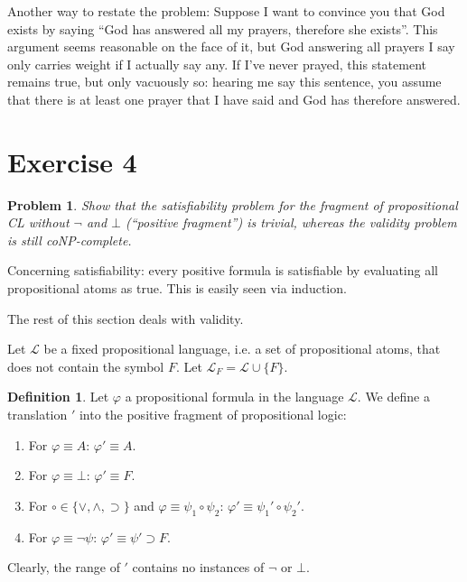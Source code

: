 \documentclass[a4paper,10pt]{article}
\newcommand{\imp}{\supset}
\renewcommand{\L}{\mathcal{L}}
\newcommand{\Lf}{\L_F}
\newtheorem*{problem*}{Problem}
\theoremstyle{definition}
\newtheorem{definition}[theorem]{Definition}
\begin{document}
Another way to restate the problem: Suppose I want to convince you that God exists by saying ``God has answered all my prayers, therefore she exists''. This argument seems reasonable on the face of it, but God answering all prayers I say only carries weight if I actually say any. If I've never prayed, this statement remains true, but only vacuously so: hearing me say this sentence, you assume that there is at least one prayer that I have said and God has therefore answered.
\section{Exercise 4}
\begin{problem*}
Show  that  the  satisfiability  problem  for  the  fragment  of  propositional CL without $¬$ and $\bot$ (``positive fragment'') is trivial, whereas the validity problem is still coNP-complete.
\end{problem*}

Concerning satisfiability: every positive formula is satisfiable by evaluating all propositional atoms as true. This is easily seen via induction.

The rest of this section deals with validity.

Let $\L$ be a fixed propositional language, i.e. a set of propositional atoms, that does not contain the symbol $F$. Let $\Lf = \L ∪ \{F\}$.
\begin{definition}
 Let $φ$ a propositional formula in the language $\L$. We define a translation $'$ into the positive fragment of propositional logic:
 \begin{enumerate}
  \item For $φ \equiv A$: $φ' \equiv A$.
  \item For $φ \equiv \bot$: $φ' \equiv F$.
  \item For $\circ \in \{∨,∧,\imp\}$ and $φ \equiv ψ_1 \circ ψ_2$: $φ' \equiv ψ_1' \circ ψ_2'$.
  \item For $φ \equiv ¬ψ$: $φ' \equiv ψ' \imp F$.
 \end{enumerate}
\end{definition}

Clearly, the range of $'$ contains no instances of $¬$ or $\bot$.
\end{document}
